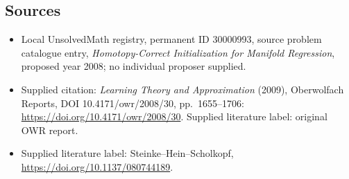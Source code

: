 \documentclass[11pt]{article}
\begin{document}
\subsection{Sources}
\begin{itemize}\item Local UnsolvedMath registry, permanent ID 30000993, source problem catalogue entry, \emph{Homotopy-Correct Initialization for Manifold Regression}, proposed year 2008; no individual proposer supplied.\item Supplied citation: \emph{Learning Theory and Approximation} (2009), Oberwolfach Reports, DOI 10.4171/owr/2008/30, pp.\ 1655--1706: \url{https://doi.org/10.4171/owr/2008/30}. Supplied literature label: original OWR report.\item Supplied literature label: Steinke--Hein--Scholkopf, \url{https://doi.org/10.1137/080744189}.\end{itemize}
\end{document}
